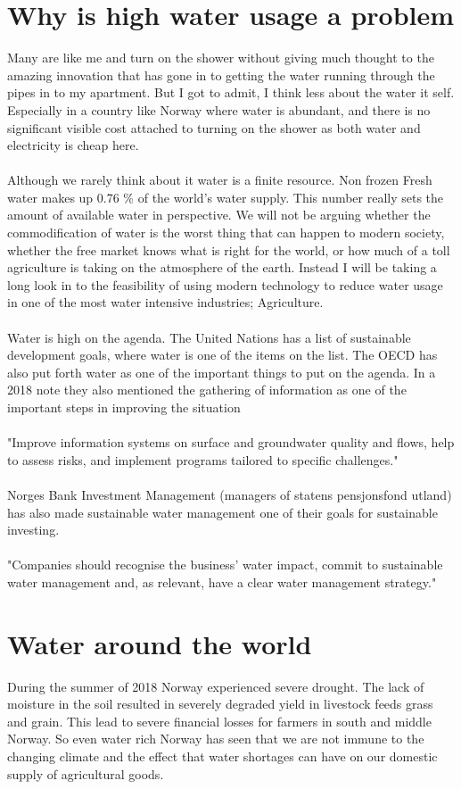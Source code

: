 \documentclass[]{uiophd}
\begin{document}
\section{Why is high water usage a problem}
Many are like me and turn on the shower without giving much thought to the amazing innovation that has gone in to getting the water running through the pipes in to my apartment. But I got to admit, I think less about the water it self. Especially in a country like Norway where water is abundant, and there is no significant visible cost attached to turning on the shower as both water and electricity is cheap here.
\\\\
Although we rarely think about it water is a finite resource. Non frozen Fresh water makes up 0.76 \% of the world's water supply.\parencite{WaterinCrisis} This number really sets the amount of available water in perspective. We will not be arguing whether the commodification of water is the worst thing that can happen to modern society, whether the free market knows what is right for the world, or how much of a toll agriculture is taking on the atmosphere of the earth. Instead I will be taking a long look in to the feasibility of using modern technology to reduce water usage in one of the most water intensive industries; Agriculture. \parencite{WorldBank}
\\\\
Water is high on the agenda. The United Nations has a list of sustainable development goals, where water is one of the items on the list. The OECD has also put forth water as one of the important things to put on the agenda. In a 2018 note they also mentioned the gathering of information as one of the important steps in improving the situation 
\\\\
"Improve information systems on surface and groundwater quality and flows, help to assess risks, and implement programs tailored to specific challenges."
\\\\
Norges Bank Investment Management (managers of statens pensjonsfond utland) has also made sustainable water management one of their goals for sustainable investing. 
\\\\
"Companies should recognise the business’
water impact, commit to sustainable water
management and, as relevant, have a clear
water management strategy." \parencite{latex2e}

\section{Water around the world}
 During the summer of 2018 Norway experienced severe drought. The lack of moisture in the soil resulted in severely degraded yield in livestock feeds grass and grain. This lead to severe financial losses for farmers in south and middle Norway. \parencite{nve} So even water rich Norway has seen that we are not immune to the changing climate and the effect that water shortages can have on our domestic supply of agricultural goods. 
\end{document}
